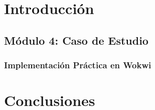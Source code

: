 \documentclass[12pt,letterpaper]{article}
\begin{document}
\thispagestyle{empty}


\newpage

\section*{Introducción}

\newpage

\subsection*{Módulo 4: Caso de Estudio}

\subsubsection*{Implementación Práctica en Wokwi}

\newpage

\section*{Conclusiones}
\end{document}
